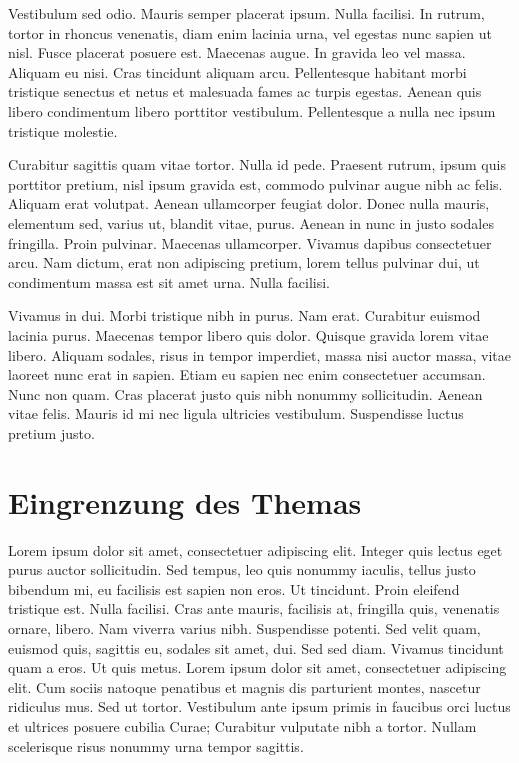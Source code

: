 Vestibulum sed odio. Mauris semper placerat ipsum. Nulla facilisi. In rutrum, tortor in rhoncus venenatis, diam enim lacinia urna, vel egestas nunc sapien ut nisl. Fusce placerat posuere est. Maecenas augue. In gravida leo vel massa. Aliquam eu nisi. Cras tincidunt aliquam arcu. Pellentesque habitant morbi tristique senectus et netus et malesuada fames ac turpis egestas. Aenean quis libero condimentum libero porttitor vestibulum. Pellentesque a nulla nec ipsum tristique molestie.

Curabitur sagittis quam vitae tortor. Nulla id pede. Praesent rutrum, ipsum quis porttitor pretium, nisl ipsum gravida est, commodo pulvinar augue nibh ac felis. Aliquam erat volutpat. Aenean ullamcorper feugiat dolor. Donec nulla mauris, elementum sed, varius ut, blandit vitae, purus. Aenean in nunc in justo sodales fringilla. Proin pulvinar. Maecenas ullamcorper. Vivamus dapibus consectetuer arcu. Nam dictum, erat non adipiscing pretium, lorem tellus pulvinar dui, ut condimentum massa est sit amet urna. Nulla facilisi.

Vivamus in dui. Morbi tristique nibh in purus. Nam erat. Curabitur euismod lacinia purus. Maecenas tempor libero quis dolor. Quisque gravida lorem vitae libero. Aliquam sodales, risus in tempor imperdiet, massa nisi auctor massa, vitae laoreet nunc erat in sapien. Etiam eu sapien nec enim consectetuer accumsan. Nunc non quam. Cras placerat justo quis nibh nonummy sollicitudin. Aenean vitae felis. Mauris id mi nec ligula ultricies vestibulum. Suspendisse luctus pretium justo. 

\section{Eingrenzung des Themas}
\label{ch:eingrenzungThema}
Lorem ipsum dolor sit amet, consectetuer adipiscing elit. Integer quis lectus eget purus auctor sollicitudin. Sed tempus, leo quis nonummy iaculis, tellus justo bibendum mi, eu facilisis est sapien non eros. Ut tincidunt. Proin eleifend tristique est. Nulla facilisi. Cras ante mauris, facilisis at, fringilla quis, venenatis ornare, libero. Nam viverra varius nibh. Suspendisse potenti. Sed velit quam, euismod quis, sagittis eu, sodales sit amet, dui. Sed sed diam. Vivamus tincidunt quam a eros. Ut quis metus. Lorem ipsum dolor sit amet, consectetuer adipiscing elit. Cum sociis natoque penatibus et magnis dis parturient montes, nascetur ridiculus mus. Sed ut tortor. Vestibulum ante ipsum primis in faucibus orci luctus et ultrices posuere cubilia Curae; Curabitur vulputate nibh a tortor. Nullam scelerisque risus nonummy urna tempor sagittis.

